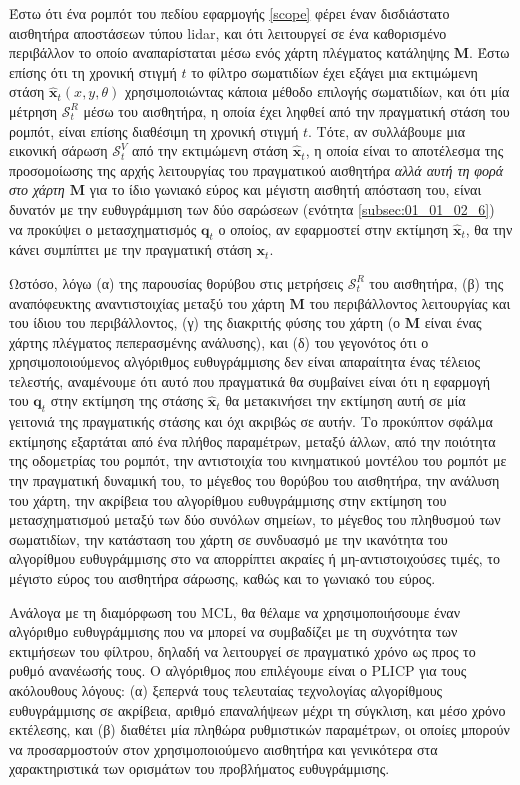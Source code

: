 Έστω ότι ένα ρομπότ του πεδίου εφαρμογής \ref{scope} φέρει έναν δισδιάστατο
αισθητήρα αποστάσεων τύπου lidar, και ότι λειτουργεί σε ένα καθορισμένο
περιβάλλον το οποίο αναπαρίσταται μέσω ενός χάρτη πλέγματος κατάληψης $\bm{M}$.
Έστω επίσης ότι τη χρονική στιγμή $t$ το φίλτρο σωματιδίων έχει εξάγει μια
εκτιμώμενη στάση $\hat{\bm{x}}_t(x,y,\theta)$ χρησιμοποιώντας κάποια μέθοδο
επιλογής σωματιδίων, και ότι μία μέτρηση $\mathcal{S}^R_t$ μέσω του αισθητήρα,
η οποία έχει ληφθεί από την πραγματική στάση του ρομπότ, είναι επίσης διαθέσιμη
τη χρονική στιγμή $t$. Τότε, αν συλλάβουμε μια εικονική σάρωση
$\mathcal{S}^V_t$ από την εκτιμώμενη στάση $\hat{\bm{x}}_t$, η οποία είναι το
αποτέλεσμα της προσομοίωσης της αρχής λειτουργίας του πραγματικού αισθητήρα
\textit{αλλά αυτή τη φορά στο χάρτη $\bm{M}$} για το ίδιο γωνιακό εύρος και
μέγιστη αισθητή απόσταση του, είναι δυνατόν με την ευθυγράμμιση των δύο
σαρώσεων (ενότητα \ref{subsec:01_01_02_6}) να προκύψει ο μετασχηματισμός
$\bm{q}_t$ ο οποίος, αν εφαρμοστεί στην εκτίμηση $\hat{\bm{x}}_t$, θα την κάνει
συμπίπτει με την πραγματική στάση $\bm{x}_t$.

Ωστόσο, λόγω (α) της παρουσίας θορύβου στις μετρήσεις $\mathcal{S}^R_t$ του
αισθητήρα, (β) της αναπόφευκτης αναντιστοιχίας μεταξύ του χάρτη $\bm{M}$ του
περιβάλλοντος λειτουργίας και του ίδιου του περιβάλλοντος, (γ) της διακριτής
φύσης του χάρτη (ο $\bm{M}$ είναι ένας χάρτης πλέγματος πεπερασμένης ανάλυσης),
και (δ) του γεγονότος ότι ο χρησιμοποιούμενος αλγόριθμος ευθυγράμμισης δεν
είναι απαραίτητα ένας τέλειος τελεστής, αναμένουμε ότι αυτό που πραγματικά θα
συμβαίνει είναι ότι η εφαρμογή του $\bm{q}_t$ στην εκτίμηση της στάσης
$\hat{\bm{x}}_t$ θα μετακινήσει την εκτίμηση αυτή σε μία γειτονιά της
πραγματικής στάσης και όχι ακριβώς σε αυτήν. Το προκύπτον σφάλμα εκτίμησης
εξαρτάται από ένα πλήθος παραμέτρων, μεταξύ άλλων, από την ποιότητα της
οδομετρίας του ρομπότ, την αντιστοιχία του κινηματικού μοντέλου του ρομπότ με
την πραγματική δυναμική του, το μέγεθος του θορύβου του αισθητήρα, την ανάλυση
του χάρτη, την ακρίβεια του αλγορίθμου ευθυγράμμισης στην εκτίμηση του
μετασχηματισμού μεταξύ των δύο συνόλων σημείων, το μέγεθος του πληθυσμού των
σωματιδίων, την κατάσταση του χάρτη σε συνδυασμό με την ικανότητα του
αλγορίθμου ευθυγράμμισης στο να απορρίπτει ακραίες ή μη-αντιστοιχούσες τιμές,
το μέγιστο εύρος του αισθητήρα σάρωσης, καθώς και το γωνιακό του εύρος.

Ανάλογα με τη διαμόρφωση του MCL, θα θέλαμε να χρησιμοποιήσουμε έναν αλγόριθμο
ευθυγράμμισης που να μπορεί να συμβαδίζει με τη συχνότητα των εκτιμήσεων του
φίλτρου, δηλαδή να λειτουργεί σε πραγματικό χρόνο ως προς το ρυθμό ανανέωσής
τους. Ο αλγόριθμος που επιλέγουμε είναι ο PLICP \cite{Censi2008a} για τους
ακόλουθους λόγους: (α) ξεπερνά τους τελευταίας τεχνολογίας αλγορίθμους
ευθυγράμμισης σε ακρίβεια, αριθμό επαναλήψεων μέχρι τη σύγκλιση, και μέσο χρόνο
εκτέλεσης, και (β) διαθέτει μία πληθώρα ρυθμιστικών παραμέτρων, οι οποίες
μπορούν να προσαρμοστούν στον χρησιμοποιούμενο αισθητήρα και γενικότερα στα
χαρακτηριστικά των ορισμάτων του προβλήματος ευθυγράμμισης.

